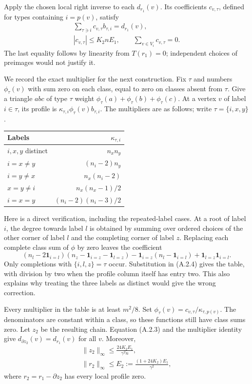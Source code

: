 \documentclass[english,11pt,a4paper]{article}
\begin{document}
Apply the chosen local right inverse to each \(d_{r_1}(v)\). Its coefficients \(c_{v,\tau}\), defined for types containing \(i=p(v)\), satisfy \[\begin{gathered}
\sum_{\tau\ni i}c_{v,\tau}b_{\tau,i}=d_{r_1}(v),\\
|c_{v,\tau}|\le K_2nE_1,
\qquad \sum_{v\in V_i}c_{v,\tau}=0.
\end{gathered}
\tag{A.2.3}\] The last equality follows by linearity from \(T(r_1)=0\); independent choices of preimages would not justify it.

We record the exact multiplier for the next construction. Fix \(\tau\) and numbers \(\phi_\tau(v)\) with sum zero on each class, equal to zero on classes absent from \(\tau\). Give a triangle \(abc\) of type \(\tau\) weight \(\phi_\tau(a)+\phi_\tau(b)+\phi_\tau(c)\). At a vertex \(v\) of label \(i\in\tau\), its profile is \(\kappa_{\tau,i}\phi_\tau(v)b_{\tau,i}\). The multipliers are as follows; write \(\tau=\{i,x,y\}\).

{\begin{longtable}[]{@{}lr@{}}
\toprule\noalign{}
Labels & \(\kappa_{\tau,i}\) \\
\midrule\noalign{}
\endhead
\bottomrule\noalign{}
\endlastfoot
\(i,x,y\) distinct & \(n_xn_y\) \\
\(i=x\ne y\) & \((n_i-2)n_y\) \\
\(i=y\ne x\) & \(n_x(n_i-2)\) \\
\(x=y\ne i\) & \(n_x(n_x-1)/2\) \\
\(i=x=y\) & \((n_i-2)(n_i-3)/2\) \\
\end{longtable}
}

Here is a direct verification, including the repeated-label cases. At a root of label \(i\), the degree towards label \(l\) is obtained by summing over ordered choices of the other corner of label \(l\) and the completing corner of label \(z\). Replacing each complete class sum of \(\phi\) by zero leaves the coefficient \[(n_l-2\mathbf1_{i=l})
(n_z-\mathbf1_{i=z}-\mathbf1_{l=z})
-\mathbf1_{i=z}(n_l-\mathbf1_{i=l})
+\mathbf1_{l=z}\mathbf1_{i=l}.
\tag{A.2.4}\] Only completions with \(\{i,l,z\}=\tau\) occur. Substitution in (A.2.4) gives the table, with division by two when the profile column itself has entry two. This also explains why treating the three labels as distinct would give the wrong correction.

Every multiplier in the table is at least \(m^2/8\). Set \(\phi_\tau(v)=c_{v,\tau}/\kappa_{\tau,p(v)}\). The denominators are constant within a class, so these functions still have class sums zero. Let \(z_2\) be the resulting chain. Equation (A.2.3) and the multiplier identity give \(d_{\partial z_2}(v)=d_{r_1}(v)\) for all \(v\). Moreover, \[\begin{gathered}
\|z_2\|_\infty\le\frac{24K_2E_1}{\gamma^2n},\\
\|r_2\|_\infty\le E_2:=\frac{(1+24K_2)E_1}{\gamma^2},
\end{gathered}
\tag{A.2.5}\] where \(r_2=r_1-\partial z_2\) has every local profile zero.
\end{document}
